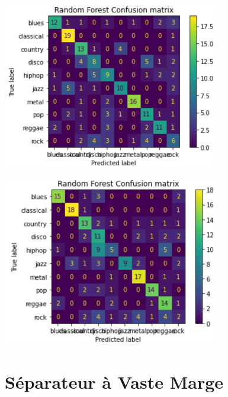 \documentclass[10pt]{article}
\begin{document}
\begin{minipage}[t]{0.5\linewidth}

\includegraphics[width=0.7\textwidth]{RandomForest-ConfusionMatrix.png}

\end{minipage}
\begin{minipage}[t]{0.5\linewidth}

\includegraphics[width=0.7\textwidth]{RandomForest-ConfusionMatrix2.png}

\end{minipage}
\vspace{0.2cm}



\section{Séparateur à Vaste Marge}
\end{document}
